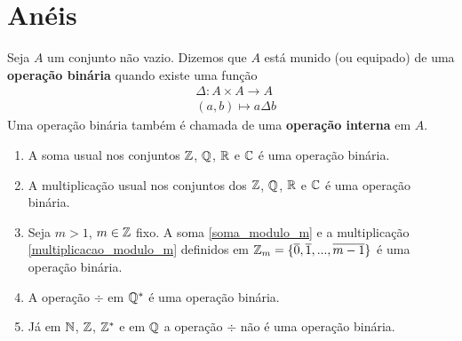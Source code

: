 \chapter{An{\'e}is}

\begin{definicao}
	Seja $A$ um conjunto n{\~a}o vazio. Dizemos que $A$ est{\'a} munido (ou equipado) de uma \textbf{opera{\c c}{\~a}o bin{\'a}ria} quando existe uma fun{\c c}{\~a}o
	\begin{align*}
		&\Delta : A \times A \to A\\
		&(a,b) \longmapsto a\Delta b		
	\end{align*}
	Uma opera{\c c}{\~a}o bin{\'a}ria tamb{\'e}m {\'e} chamada de uma \textbf{opera{\c c}{\~a}o interna} em $A$.
\end{definicao}

\begin{exemplos}
	\begin{enumerate}[label={\arabic*})]
		\item A soma usual nos conjuntos $\mathbb{Z}$, $\mathbb{Q}$, $\mathbb{R}$ e $\mathbb{C}$ {\'e} uma opera{\c c}{\~a}o bin{\'a}ria.

		\item A multiplica\c{c}\~ao usual nos conjuntos dos $\mathbb{Z}$, $\mathbb{Q}$, $\mathbb{R}$ e $\mathbb{C}$ {\'e} uma opera{\c c}{\~a}o bin{\'a}ria.

		\item Seja $m > 1$, $m \in \mathbb{Z}$ fixo. A soma \eqref{soma_modulo_m} e a multiplica\c{c}\~ao \eqref{multiplicacao_modulo_m} definidos em $\mathbb{Z}_m = \{\overline{0},\overline{1},...,\overline{m-1}\}$ \'e uma opera\c{c}\~ao bin\'aria.

		\item A opera\c{c}\~ao $\div$ em $\mathbb{Q}^{*}$ {\'e} uma opera{\c c}{\~a}o bin{\'a}ria.
		\item J\'a em $\mathbb{N}$, $\mathbb{Z}$, $\mathbb{Z}^{*}$ e em $\mathbb{Q}$ a opera\c{c}\~ao $\div$ n{\~a}o {\'e} uma opera{\c c}{\~a}o bin{\'a}ria.
	\end{enumerate}
\end{exemplos}

